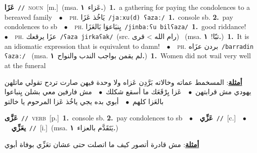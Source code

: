 \documentclass[10pt,a4paper,twoside]{article} %
\begin{document}
\begin{multicols}{2}
{\setlength\topsep{0pt}\textbf{\foreignlanguage{arabic}{عَزَا}}\ {\color{gray}\texttt{//}\color{black}}\ \textsc{noun}\ [m.]\ \color{gray}(msa. \foreignlanguage{arabic}{عَزاء}~\foreignlanguage{arabic}{\textbf{١.}})\color{black}\ \textbf{1.}~a gathering for paying the condolences to a bereaved family\ \ $\bullet$\ \ \textsc{ph.} \color{gray} \foreignlanguage{arabic}{يَاخُذ عَزَا}\color{black}\ {\color{gray}\texttt{/{\sffamily jaːxu(d) ʕazaː}/}\color{black}}\ \textbf{1.}~console sb.  \textbf{2.}~pay condolences to sb\ \ $\bullet$\ \ \textsc{ph.} \color{gray} \foreignlanguage{arabic}{يِنبَاعوَا بَالعَزَا}\color{black}\ {\color{gray}\texttt{/{\sffamily jinbaːʕu bilʕaza}/}\color{black}}\ \textbf{1.}~good riddance!\ \ $\bullet$\ \ \textsc{ph.} \color{gray} \foreignlanguage{arabic}{عزَا يرقعك}\color{black}\ {\color{gray}\texttt{/{\sffamily ʕaza jirkaʕak}/}\color{black}}\ \color{gray}(src. \foreignlanguage{arabic}{رام الله > قرى})\color{black}\ \color{gray} (msa. \foreignlanguage{arabic}{تبّا!}~\foreignlanguage{arabic}{\textbf{١.}})\color{black}\ \textbf{1.}~It is an idiomatic expression that is equivalent to damn!\ \ $\bullet$\ \ \textsc{ph.} \color{gray} \foreignlanguage{arabic}{بردن عزَاه}\color{black}\ {\color{gray}\texttt{/{\sffamily barradin ʕazaː}/}\color{black}}\ \color{gray} (msa. \foreignlanguage{arabic}{لم يقمن بواجب الندب والنواح}~\foreignlanguage{arabic}{\textbf{١.}})\color{black}\ \textbf{1.}~Women did not wail very well at the funeral\  \begin{flushright}\color{gray}\foreignlanguage{arabic}{\textbf{\underline{\foreignlanguage{arabic}{أمثلة}}}: المسخمط عماته وخالاته بَرَّدِن عَزاه ولا وحدة فيهن صارت تردح تقولي ماتلهن يهودي مش قرابتهن\ $\bullet$\ \  عَزا يِرْقَعَك ما أسقع شكلك\ $\bullet$\ \  مش فارفين معي بشلن يِنباعوا بالعَزا كلهم\ $\bullet$\ \  أبوي بده يجي ياخُذ عَزا المرحوم يا خالتو}\end{flushright}\color{black}} \vspace{2mm}

{\setlength\topsep{0pt}\textbf{\foreignlanguage{arabic}{عَزَّى}}\ {\color{gray}\texttt{//}\color{black}}\ \textsc{verb}\ [p.]\ \textbf{1.}~console sb.  \textbf{2.}~pay condolences to sb\ \ $\bullet$\ \ \setlength\topsep{0pt}\textbf{\foreignlanguage{arabic}{عَزِّي}}\ {\color{gray}\texttt{//}\color{black}}\ [c.]\ \ $\bullet$\ \ \setlength\topsep{0pt}\textbf{\foreignlanguage{arabic}{يعَزِّي}}\ {\color{gray}\texttt{//}\color{black}}\ [i.]\ \color{gray}(msa. \foreignlanguage{arabic}{يَتَقَدَّم بالعزاء}~\foreignlanguage{arabic}{\textbf{١.}})\color{black}\  \begin{flushright}\color{gray}\foreignlanguage{arabic}{\textbf{\underline{\foreignlanguage{arabic}{أمثلة}}}: مش قادرة أتصور كيف ما اتصلت حتى عشان تعَزِّي بوفاة أبوي}\end{flushright}\color{black}} \vspace{2mm}


\end{multicols}
\end{document}
